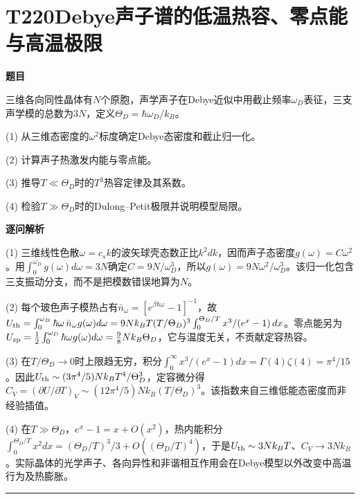 \documentclass[UTF8,a4paper,11pt,oneside,openany]{ctexbook}
\begin{document}
\section*{T220\quad Debye声子谱的低温热容、零点能与高温极限}
\textbf{题目}\par
三维各向同性晶体有$N$个原胞，声学声子在Debye近似中用截止频率$\omega_D$表征，三支声学模的总数为$3N$，定义$\Theta_D=\hbar\omega_D/k_B$。
\par\smallskip\noindent (1) 从三维态密度的$\omega^2$标度确定Debye态密度和截止归一化。
\par\smallskip\noindent (2) 计算声子热激发内能与零点能。
\par\smallskip\noindent (3) 推导$T\ll\Theta_D$时的$T^3$热容定律及其系数。
\par\smallskip\noindent (4) 检验$T\gg\Theta_D$时的Dulong–Petit极限并说明模型局限。
\par\medskip\textbf{逐问解析}\par
\par\smallskip\noindent (1) 三维线性色散$\omega=c_sk$的波矢球壳态数正比$k^2dk$，因而声子态密度$g(\omega)=C\omega^2$。用$\int_0^{\omega_D}g(\omega)d\omega=3N$确定$C=9N/\omega_D^3$，所以$g(\omega)=9N\omega^2/\omega_D^3$。该归一化包含三支振动分支，而不是把模数错误地算为$N$。
\par\smallskip\noindent (2) 每个玻色声子模热占有$\bar n_\omega=[e^{\beta\hbar\omega}-1]^{-1}$，故$U_{\rm th}=\int_0^{\omega_D}\hbar\omega\,\bar n_\omega g(\omega)d\omega=9Nk_BT(T/\Theta_D)^3\int_0^{\Theta_D/T}x^3/(e^x-1)\,dx$。零点能另为$U_{\rm zp}=\frac12\int_0^{\omega_D}\hbar\omega g(\omega)d\omega=\frac98Nk_B\Theta_D$，它与温度无关，不贡献定容热容。
\par\smallskip\noindent (3) 在$T/\Theta_D\to0$时上限趋无穷，积分$\int_0^\infty x^3/(e^x-1)dx=\Gamma(4)\zeta(4)=\pi^4/15$。因此$U_{\rm th}\sim(3\pi^4/5)Nk_B T^4/\Theta_D^3$，定容微分得$C_V=(\partial U/\partial T)_V\sim(12\pi^4/5)Nk_B(T/\Theta_D)^3$。该指数来自三维低能态密度而非经验插值。
\par\smallskip\noindent (4) 在$T\gg\Theta_D$，$e^x-1=x+O(x^2)$，热内能积分$\int_0^{\Theta_D/T}x^2dx=(\Theta_D/T)^3/3+O((\Theta_D/T)^4)$，于是$U_{\rm th}\sim3Nk_BT$、$C_V\to3Nk_B$。实际晶体的光学声子、各向异性和非谐相互作用会在Debye模型以外改变中高温行为及热膨胀。
\par\medskip\hrule\medskip
\end{document}
